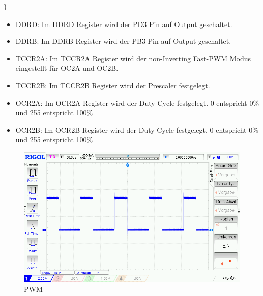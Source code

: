 \begin{itemize}
\begin{lstlisting}[caption=$\mu$C-Programm,language=c]
}
\end{lstlisting}

\begin{itemize}
\item DDRD: Im DDRD Register wird der PD3 Pin auf Output geschaltet.\\
\item DDRB: Im DDRB Register wird der PB3 Pin auf Output geschaltet.\\
\item TCCR2A: Im TCCR2A Register wird der non-Inverting Fast-PWM Modus eingestellt für OC2A und OC2B. \\
\item TCCR2B: Im TCCR2B Register wird der Prescaler festgelegt. \\
\item OCR2A: Im OCR2A Register wird der Duty Cycle festgelegt. 0 entspricht 0\% und 255 entspricht 100\% \\
\item OCR2B: Im OCR2B Register wird der Duty Cycle festgelegt. 0 entspricht 0\% und 255 entspricht 100\% \\
\end{itemize}
\end{itemize}


\begin{figure}[H] 
\begin{center}

\includegraphics[width=15cm]{Bilder/PWM/pwm}
\caption{PWM}
\label{PWM}

\end{center}
\end{figure}
\newpage
